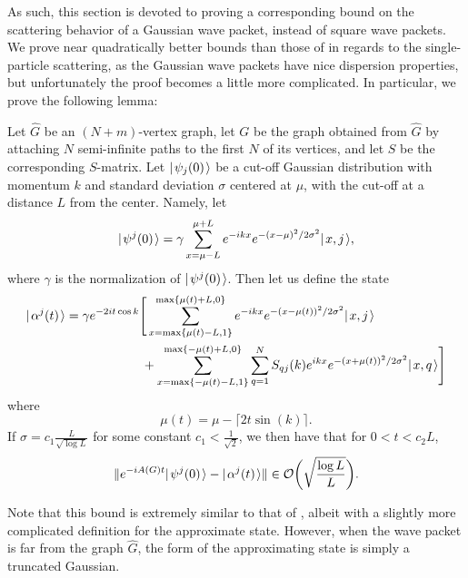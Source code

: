 \documentclass[../thesis-main/thesis-main]{subfiles}
\begin{document}
As such, this section is devoted to proving a corresponding bound on the scattering behavior of a Gaussian wave packet, instead of square wave packets.  We prove near quadratically better bounds than those of \cite{MPQW} in regards to the single-particle scattering, as the Gaussian wave packets have nice dispersion properties, but unfortunately the proof becomes a little more complicated.  In particular, we prove the following lemma:
\begin{theorem}
  Let $\widehat{G}$ be an $(N+m)$-vertex graph, let $G$ be the graph obtained from $\widehat{G}$ by attaching $N$ semi-infinite paths to the first $N$ of its vertices, and let $S$ be the corresponding $S$-matrix.  Let $|\mspace{2mu} \psi_j(0) \mspace{2mu} \rangle$ be a cut-off Gaussian distribution with momentum $k$ and standard deviation $\sigma$ centered at $\mu$, with the cut-off at a distance $L$ from the center.  Namely, let 
  \begin{equation}
    |\mspace{2mu} \psi^j(0) \mspace{2mu} \rangle = \gamma \sum_{x = \mu - L}^{\mu + L} e^{- i k x} e^{- (x - \mu)^2/2\sigma^2} |\mspace{2mu} x,j \mspace{2mu} \rangle  \label{eq:guass_start_defn},
  \end{equation}
  where $\gamma$ is the normalization of $|\mspace{2mu} \psi^j(0) \mspace{2mu} \rangle$.  Then let us define the state 
  \begin{align}
    |\mspace{2mu} \alpha^j(t) \mspace{2mu} \rangle &= \gamma e^{-2 i t \cos k} \Bigg[ \sum_{x = \max\{\mu(t) -L,1\}}^{\max\{\mu(t)+L,0\}} e^{-i k x} e^{ -(x - \mu(t))^2/2\sigma^2} 
    			 |\mspace{2mu} x,j \mspace{2mu} \rangle \nonumber\\
			  &\qquad\qquad\qquad+ \sum_{x = \max\{-\mu(t)-L,1\}}^{\max\{-\mu(t) + L,0\}} \sum_{q=1}^N  S_{qj}(k) e^{i k x} e^{-(x + \mu(t))^2/2\sigma^2} |\mspace{2mu} x,q \mspace{2mu} \rangle \Bigg]\label{eq:guass_approximation_defn}
  \end{align}
  where
  \begin{equation}
    \mu(t) = \mu - \lceil 2 t \sin(k)\rceil.
  \end{equation}
  If $\sigma = c_1 \frac{ L}{\sqrt{\log L}}$ for some constant $c_1 < \frac{1}{\sqrt{2}}$, we then have that for $0 < t < c_2 L$,  
  \begin{equation}
    \|{e^{-i A(G) t} |\mspace{2mu} \psi^j(0) \mspace{2mu} \rangle - |\mspace{2mu} \alpha^j (t) \mspace{2mu} \rangle}\| \in \mathcal{O} \bigg(\sqrt{\frac{\log L}{L}} \bigg).
  \end{equation}  
\label{thm:single_particle_wavepacket_bound}
\end{theorem}

Note that this bound is extremely similar to that of \cite{MPQW}, albeit with a slightly more complicated definition for the approximate state.  However, when the wave packet is far from the graph $\widehat{G}$, the form of the approximating state is simply a truncated Gaussian.
\end{document}

